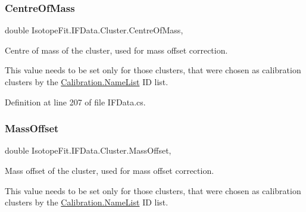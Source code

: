 \mbox{\label{class_isotope_fit_1_1_i_f_data_1_1_cluster_a43d9e77aebe1e02b617b16aff448c613}} 
\subsubsection{\texorpdfstring{Centre\+Of\+Mass}{CentreOfMass}}
{\footnotesize\ttfamily double Isotope\+Fit.\+I\+F\+Data.\+Cluster.\+Centre\+Of\+Mass\hspace{0.3cm}{\ttfamily [get]}, {\ttfamily [set]}}



Centre of mass of the cluster, used for mass offset correction. 

This value needs to be set only for those clusters, that were chosen as calibration clusters by the \mbox{\hyperlink{class_isotope_fit_1_1_i_f_data_1_1_calibration_a2e347f087df878f22010302bda7db4be}{Calibration.\+Name\+List}} ID list. 

Definition at line 207 of file I\+F\+Data.\+cs.

\mbox{\label{class_isotope_fit_1_1_i_f_data_1_1_cluster_afa64046ba8bdad51edc7ca5c1c39cd8c}} 
\subsubsection{\texorpdfstring{Mass\+Offset}{MassOffset}}
{\footnotesize\ttfamily double Isotope\+Fit.\+I\+F\+Data.\+Cluster.\+Mass\+Offset\hspace{0.3cm}{\ttfamily [get]}, {\ttfamily [set]}}



Mass offset of the cluster, used for mass offset correction. 

This value needs to be set only for those clusters, that were chosen as calibration clusters by the \mbox{\hyperlink{class_isotope_fit_1_1_i_f_data_1_1_calibration_a2e347f087df878f22010302bda7db4be}{Calibration.\+Name\+List}} ID list. 

